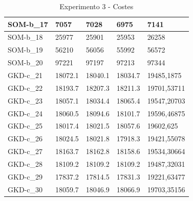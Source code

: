 \documentclass[11pt,a4paper]{article}
\begin{document}
\begin{table}[H]
\begin{tabular}{l|l|l|l|l|}
			\multicolumn{1}{|l|}{SOM-b\_17} & 7057           & 7028            & 6975        & 7141        \\ \hline
			\multicolumn{1}{|l|}{SOM-b\_18} & 25977          & 25901           & 25953       & 26258       \\ \hline
			\multicolumn{1}{|l|}{SOM-b\_19} & 56210          & 56056           & 55992       & 56572       \\ \hline
			\multicolumn{1}{|l|}{SOM-b\_20} & 97221          & 97197           & 97213       & 97344       \\ \hline
			\multicolumn{1}{|l|}{GKD-c\_21} & 18072.1        & 18040.1         & 18034.7     & 19485,1875  \\ \hline
			\multicolumn{1}{|l|}{GKD-c\_22} & 18193.7        & 18207.3         & 18211.3     & 19701,53711 \\ \hline
			\multicolumn{1}{|l|}{GKD-c\_23} & 18057.1        & 18034.4         & 18065.4     & 19547,20703 \\ \hline
			\multicolumn{1}{|l|}{GKD-c\_24} & 18060.5        & 18094.6         & 18101.7     & 19596,46875 \\ \hline
			\multicolumn{1}{|l|}{GKD-c\_25} & 18017.4        & 18021.5         & 18057.6     & 19602,625   \\ \hline
			\multicolumn{1}{|l|}{GKD-c\_26} & 18024.5        & 18021.8         & 17918.3     & 19421,55078 \\ \hline
			\multicolumn{1}{|l|}{GKD-c\_27} & 18163.7        & 18162.8         & 18158.6     & 19534,30664 \\ \hline
			\multicolumn{1}{|l|}{GKD-c\_28} & 18109.2        & 18109.2         & 18109.2     & 19487,32031 \\ \hline
			\multicolumn{1}{|l|}{GKD-c\_29} & 17837.2        & 17814.5         & 17831.3     & 19221,63477 \\ \hline
			\multicolumn{1}{|l|}{GKD-c\_30} & 18059.7        & 18046.9         & 18066.9     & 19703,35156 \\ \hline
		\end{tabular}
		\caption{ Experimento 3 - Costes }
		\label{costes3}
	\end{table}
	
\end{document}

